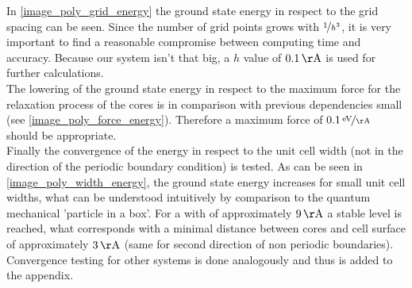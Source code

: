 In \cref{image_poly_grid_energy} the ground state energy in respect to the grid spacing can be seen. Since the number of grid points grows with $\nicefrac{1}{h^3}$, it is very important to find a reasonable compromise between computing time and accuracy. Because our system isn't that big, a $h$ value of $\unit[0.1]{\AA}$ is used for further calculations.\\
The lowering of the ground state energy in respect to the maximum force for the relaxation process of the cores is in comparison with previous dependencies small (see \cref{image_poly_force_energy}). Therefore a maximum force of $\unitfrac[0.1]{eV}{\AA}$ should be appropriate.\\
Finally the convergence of the energy in respect to the unit cell width (not in the direction of the periodic boundary condition) is tested. As can be seen in \cref{image_poly_width_energy}, the ground state energy increases for small unit cell widths, what can be understood intuitively by comparison to the quantum mechanical 'particle in a box'. For a with of approximately $\unit[9]{\AA}$ a stable level is reached, what corresponds with a minimal distance between cores and cell surface of approximately $\unit[3]{\AA}$ (same for second direction of non periodic boundaries).\\
Convergence testing for other systems is done analogously and thus is added to the appendix.

